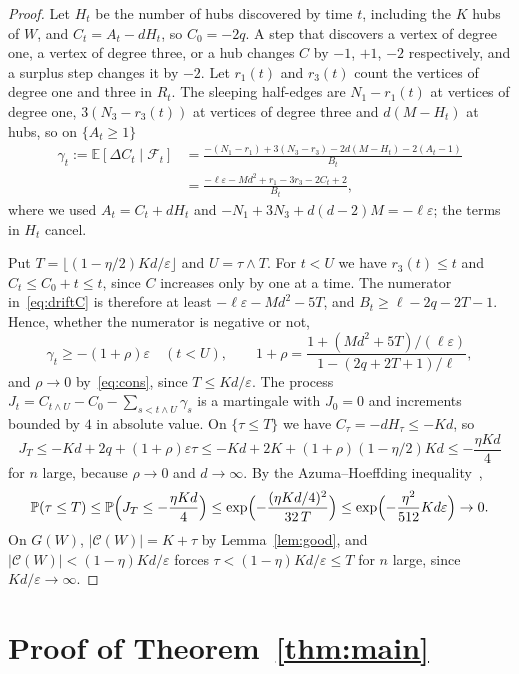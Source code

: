 \documentclass[11pt]{amsart}
\theoremstyle{definition}
\theoremstyle{remark}
\numberwithin{equation}{section}
\newcommand{\PP}{\mathbb P}
\newcommand{\E}{\mathbb E}
\newcommand{\eps}{\varepsilon}
\newcommand{\cF}{\mathcal F}
\newcommand{\cC}{\mathcal C}
\begin{document}
\begin{proof}
Let $H_t$ be the number of hubs discovered by time $t$, including the $K$ hubs of $W$, and $C_t=A_t-dH_t$, so $C_0=-2q$. A step that discovers a vertex of degree one, a vertex of degree three, or a hub changes $C$ by $-1$, $+1$, $-2$ respectively, and a surplus step changes it by $-2$. Let $r_1(t)$ and $r_3(t)$ count the vertices of degree one and three in $R_t$. The sleeping half-edges are $N_1-r_1(t)$ at vertices of degree one, $3(N_3-r_3(t))$ at vertices of degree three and $d(M-H_t)$ at hubs, so on $\{A_t\ge1\}$
\begin{equation}\label{eq:driftC}
\begin{split}
\gamma_t:=\E[\Delta C_t\mid\cF_t]&=\frac{-(N_1-r_1)+3(N_3-r_3)-2d(M-H_t)-2(A_t-1)}{B_t}\\
&=\frac{-\ell\eps-Md^2+r_1-3r_3-2C_t+2}{B_t},
\end{split}
\end{equation}
where we used $A_t=C_t+dH_t$ and $-N_1+3N_3+d(d-2)M=-\ell\eps$; the terms in $H_t$ cancel.

Put $T=\lfloor(1-\eta/2)Kd/\eps\rfloor$ and $U=\tau\wedge T$. For $t<U$ we have $r_3(t)\le t$ and $C_t\le C_0+t\le t$, since $C$ increases only by one at a time. The numerator in~\eqref{eq:driftC} is therefore at least $-\ell\eps-Md^2-5T$, and $B_t\ge\ell-2q-2T-1$. Hence, whether the numerator is negative or not,
\[
\gamma_t\ge-(1+\rho)\eps\quad(t<U),\qquad 1+\rho=\frac{1+(Md^2+5T)/(\ell\eps)}{1-(2q+2T+1)/\ell},
\]
and $\rho\to0$ by~\eqref{eq:cons}, since $T\le Kd/\eps$. The process $J_t=C_{t\wedge U}-C_0-\sum_{s<t\wedge U}\gamma_s$ is a martingale with $J_0=0$ and increments bounded by $4$ in absolute value. On $\{\tau\le T\}$ we have $C_\tau=-dH_\tau\le-Kd$, so
\[
J_T\le-Kd+2q+(1+\rho)\eps\tau\le-Kd+2K+(1+\rho)(1-\eta/2)Kd\le-\frac{\eta Kd}{4}
\]
for $n$ large, because $\rho\to0$ and $d\to\infty$. By the Azuma--Hoeffding inequality~\cite{Azu67},
\[
\PP(\tau\le T)\le\PP\Bigl(J_T\le-\frac{\eta Kd}4\Bigr)\le\exp\Bigl(-\frac{(\eta Kd/4)^2}{32\,T}\Bigr)\le\exp\Bigl(-\frac{\eta^2}{512}Kd\eps\Bigr)\to0 .
\]
On $G(W)$, $|\cC(W)|=K+\tau$ by Lemma~\ref{lem:good}, and $|\cC(W)|<(1-\eta)Kd/\eps$ forces $\tau<(1-\eta)Kd/\eps\le T$ for $n$ large, since $Kd/\eps\to\infty$.
\end{proof}

\section{Proof of Theorem~\ref{thm:main}}
\end{document}
